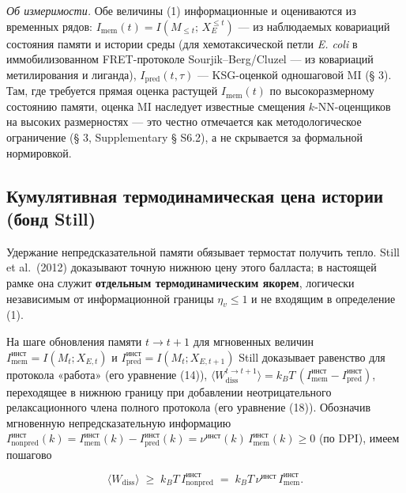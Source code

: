 \documentclass[pdflatex,sn-mathphys-ay]{sn-jnl}
\begin{document}
\emph{Об измеримости.} Обе величины (1) информационные и оцениваются из временных рядов: \(I_{\text{mem}}(t) = I(M_{\le t};\, X_E^{\le t})\) --- из наблюдаемых ковариаций состояния памяти и истории среды (для хемотаксической петли \emph{E. coli} в иммобилизованном FRET-протоколе Sourjik--Berg/Cluzel --- из ковариаций метилирования и лиганда), \(I_{\text{pred}}(t,\tau)\) --- KSG-оценкой одношаговой MI (§ 3). Там, где требуется прямая оценка растущей \(I_{\text{mem}}(t)\) по высокоразмерному состоянию памяти, оценка MI наследует известные смещения \(k\)-NN-оценщиков на высоких размерностях --- это честно отмечается как методологическое ограничение (§ 3, Supplementary § S6.2), а не скрывается за формальной нормировкой.



\subsection{Кумулятивная термодинамическая цена истории (бонд Still)}\label{ux43aux443ux43cux443ux43bux44fux442ux438ux432ux43dux430ux44f-ux442ux435ux440ux43cux43eux434ux438ux43dux430ux43cux438ux447ux435ux441ux43aux430ux44f-ux446ux435ux43dux430-ux438ux441ux442ux43eux440ux438ux438-ux431ux43eux43dux434-still}



Удержание непредсказательной памяти обязывает термостат получить тепло. Still et al.~(2012) доказывают точную нижнюю цену этого балласта; в настоящей рамке она служит \textbf{отдельным термодинамическим якорем}, логически независимым от информационной границы \(\eta_v \le 1\) и не входящим в определение (1).



На шаге обновления памяти \(t \to t+1\) для мгновенных величин \(I_{\text{mem}}^{\text{инст}} = I(M_t; X_{E,t})\) и \(I_{\text{pred}}^{\text{инст}} = I(M_t; X_{E,t+1})\) Still доказывает равенство для протокола «работа» (его уравнение (14)), \(\langle W_{\text{diss}}^{t\to t+1}\rangle = k_B T\,(I_{\text{mem}}^{\text{инст}} - I_{\text{pred}}^{\text{инст}})\), переходящее в нижнюю границу при добавлении неотрицательного релаксационного члена полного протокола (его уравнение (18)). Обозначив мгновенную непредсказательную информацию \(I_{\text{nonpred}}^{\text{инст}}(k) = I_{\text{mem}}^{\text{инст}}(k) - I_{\text{pred}}^{\text{инст}}(k) = \nu^{\text{инст}}(k)\, I_{\text{mem}}^{\text{инст}}(k) \ge 0\) (по DPI), имеем пошагово



\begin{equation}\langle W_{\text{diss}} \rangle \;\ge\; k_B T\, I_{\text{nonpred}}^{\text{инст}} \;=\; k_B T\, \nu^{\text{инст}}\, I_{\text{mem}}^{\text{инст}}. \tag{2}\end{equation}
\end{document}
